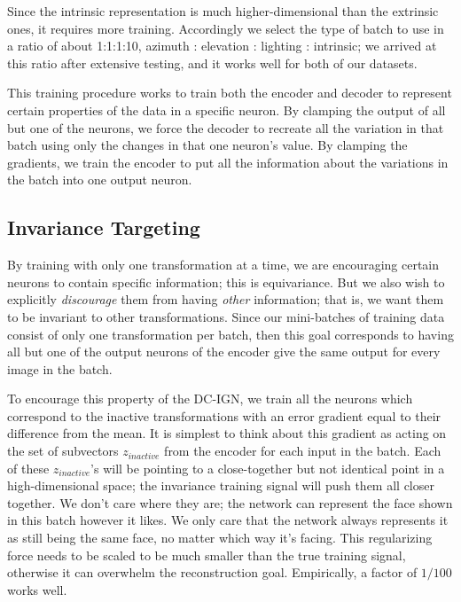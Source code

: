 \documentclass[12pt,twoside]{mitthesis}
\begin{document}
Since the intrinsic representation is much higher-dimensional than the
extrinsic ones, it requires more training. Accordingly we select the
type of batch to use in a ratio of about 1:1:1:10, azimuth : elevation :
lighting : intrinsic; we arrived at this ratio after extensive testing,
and it works well for both of our datasets.

This training procedure works to train both the encoder and decoder to
represent certain properties of the data in a specific neuron. By
clamping the output of all but one of the neurons, we force the decoder
to recreate all the variation in that batch using only the changes in
that one neuron's value. By clamping the gradients, we train the encoder
to put all the information about the variations in the batch into one
output neuron.

\subsection{Invariance Targeting}\label{sec:targetedinvar}

By training with only one transformation at a time, we are encouraging
certain neurons to contain specific information; this is equivariance.
But we also wish to explicitly \emph{discourage} them from having
\emph{other} information; that is, we want them to be invariant to other
transformations. Since our mini-batches of training data consist of only
one transformation per batch, then this goal corresponds to having all
but one of the output neurons of the encoder give the same output for
every image in the batch.

To encourage this property of the DC-IGN, we train all the neurons which
correspond to the inactive transformations with an error gradient equal
to their difference from the mean. It is simplest to think about this
gradient as acting on the set of subvectors \(z_{inactive}\) from the
encoder for each input in the batch. Each of these \(z_{inactive}\)'s
will be pointing to a close-together but not identical point in a
high-dimensional space; the invariance training signal will push them
all closer together. We don't care where they are; the network can
represent the face shown in this batch however it likes. We only care
that the network always represents it as still being the same face, no
matter which way it's facing. This regularizing force needs to be scaled
to be much smaller than the true training signal, otherwise it can
overwhelm the reconstruction goal. Empirically, a factor of \(1/100\)
works well.
\end{document}
